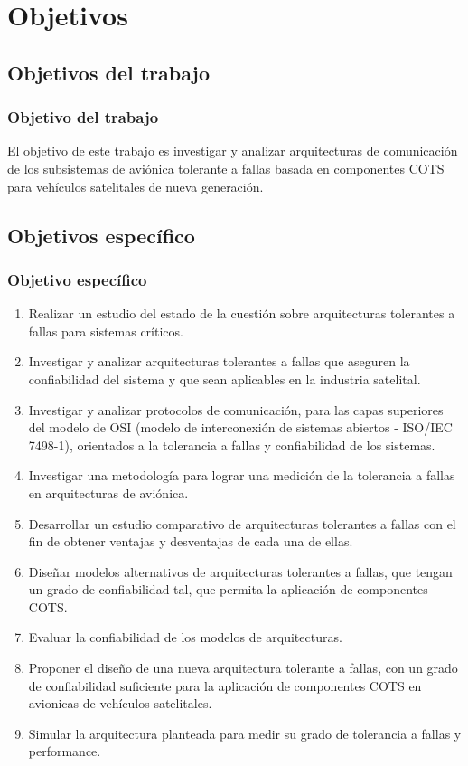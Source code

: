 \section{Objetivos}
\subsection{Objetivos del trabajo}
\begin{frame}
    \frametitle{Objetivo del trabajo}
    El objetivo de este trabajo es investigar y analizar arquitecturas de comunicación de los subsistemas de aviónica tolerante a fallas basada en componentes COTS para vehículos satelitales de nueva generación.
\end{frame}

\subsection{Objetivos específico}
\begin{frame}[allowframebreaks]
	\frametitle{Objetivo específico}
	\begin{enumerate}
		\item Realizar un estudio del estado de la cuestión sobre arquitecturas tolerantes a fallas para sistemas críticos.
		\item Investigar y analizar arquitecturas tolerantes a fallas que aseguren la confiabilidad del sistema y que sean aplicables en la industria satelital.
		\item Investigar y analizar protocolos de comunicación, para las capas superiores del modelo de OSI (modelo de interconexión de sistemas abiertos - ISO/IEC 7498-1), orientados a la tolerancia a fallas y confiabilidad de los sistemas. 
		\item Investigar una metodología para lograr una medición de la tolerancia a fallas en arquitecturas de aviónica.
		\item Desarrollar un estudio comparativo de arquitecturas tolerantes a fallas con el fin de obtener ventajas y desventajas de cada una de ellas.
		\item Diseñar modelos alternativos de arquitecturas tolerantes a fallas, que tengan un grado de confiabilidad tal, que permita la aplicación de componentes COTS.
		\item Evaluar la confiabilidad de los modelos de arquitecturas.
		\item Proponer el diseño de una nueva arquitectura tolerante a fallas, con un grado de confiabilidad suficiente para la aplicación de componentes COTS en avionicas de vehículos satelitales.
		\item Simular la arquitectura planteada para medir su grado de tolerancia a fallas y performance.
	\end{enumerate}
\end{frame}

